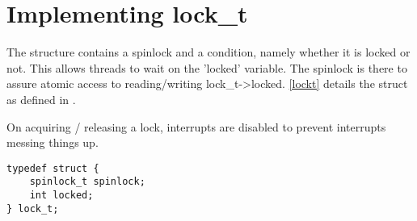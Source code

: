 \section{Implementing lock\_t}

The  structure contains a spinlock and a condition,
namely whether it is locked or not. This allows threads to wait on
the 'locked' variable. The spinlock is there to assure atomic access
to reading/writing lock\_t->locked. \autoref{lockt} details the struct
as defined in .

On acquiring / releasing a lock, interrupts are disabled to prevent
interrupts messing things up.

\lstset{caption=The lock\_t structure.,label=lockt,float}
\begin{lstlisting}
typedef struct {
	spinlock_t spinlock;
	int locked;
} lock_t;
\end{lstlisting}

\FloatBarrier %
